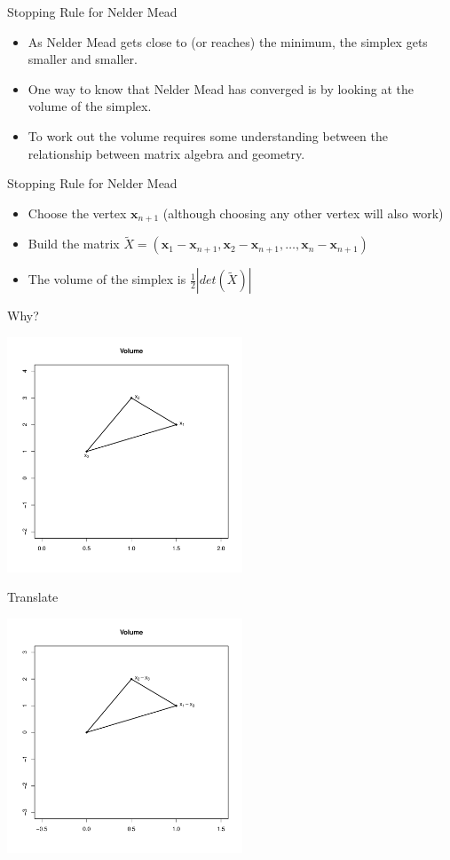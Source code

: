 \documentclass[10pt]{beamer}
\begin{document}
\begin{frame}{Stopping Rule for Nelder Mead}
  \begin{itemize}
  \item As Nelder Mead gets close to (or reaches) the minimum, the simplex gets smaller and smaller.

  \item One way to know that Nelder Mead has converged is by looking at the volume of the simplex.

  \item To work out the volume requires some understanding between the relationship between matrix algebra and geometry.
  \end{itemize}
\end{frame}
\begin{frame}{Stopping Rule for Nelder Mead}
  \begin{itemize}
  \item Choose the vertex ${\bm x_{n+1}}$ (although choosing any other vertex will also work)
  \item Build the matrix
    $\tilde{X}=\left({\bm x_1}-{\bm x_{n+1}},{\bm x_2-{\bm x_{n+1}}},\ldots, {\bm x_{n}-{\bm x_{n+1}}}\right)$
  \item The volume of the simplex is $\frac{1}{2}|det(\tilde{X})|$
  \end{itemize}
\end{frame}
\begin{frame}{Why?}
  \begin{center}
    \includegraphics[height=7cm]{RCode/geom1.pdf}
  \end{center}
\end{frame}
\begin{frame}{Translate}
  \begin{center}
    \includegraphics[height=7cm]{RCode/geom2.pdf}
  \end{center}
\end{frame}
\end{document}
